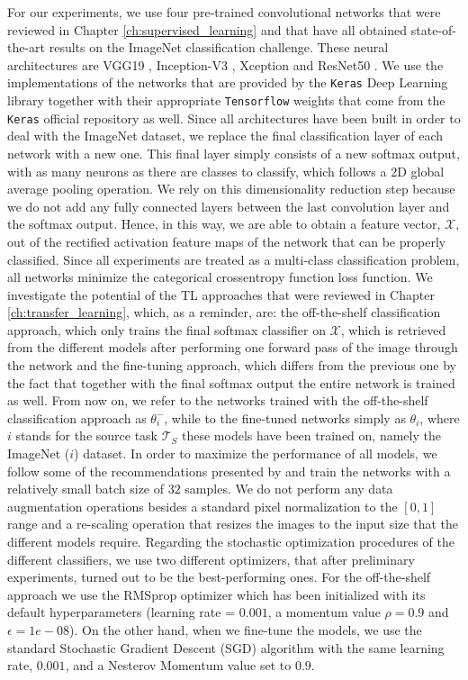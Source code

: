 For our experiments, we use four pre-trained convolutional networks that were reviewed in Chapter \ref{ch:supervised_learning} and that have all obtained state-of-the-art results on the ImageNet classification challenge. These neural architectures are VGG19 \cite{simonyan2014very}, Inception-V3 \cite{szegedy2016rethinking}, Xception \cite{chollet2016xception} and ResNet50 \cite{xie2017aggregated}. We use the implementations of the networks that are provided by the \texttt{Keras} Deep Learning library \cite{chollet2015keras} together with their appropriate \texttt{Tensorflow} weights \cite{abadi2016tensorflow} that come from the \texttt{Keras} official repository as well. Since all architectures have been built in order to deal with the ImageNet dataset, we replace the final classification layer of each network with a new one. This final layer simply consists of a new softmax output, with as many neurons as there are classes to classify, which follows a 2D global average pooling operation. We rely on this dimensionality reduction step because we do not add any fully connected layers between the last convolution layer and the softmax output. Hence, in this way, we are able to obtain a feature vector, $\mathscr{X}$, out of the rectified activation feature maps of the network that can be properly classified. Since all experiments are treated as a multi-class classification problem, all networks minimize the categorical crossentropy function loss function. We investigate the potential of the TL approaches that were reviewed in Chapter \ref{ch:transfer_learning}, which, as a reminder, are: the off-the-shelf classification approach, which only trains the final softmax classifier on $\mathscr{X}$, which is retrieved from the different models after performing one forward pass of the image through the network and the fine-tuning approach, which differs from the previous one by the fact that together with the final softmax output the entire network is trained as well. 
From now on, we refer to the networks trained with the off-the-shelf classification approach as $\theta^{-}_{i}$, while to the fine-tuned networks simply as $\theta_{i}$, where $i$ stands for the source task $\mathcal{T}_S$ these models have been trained on, namely the ImageNet ($i$) dataset. In order to maximize the performance of all models, we follow some of the recommendations presented by \citet{masters2018revisiting} and train the networks with a relatively small batch size of $32$ samples. We do not perform any data augmentation operations besides a standard pixel normalization to the $[0, 1]$ range and a re-scaling operation that resizes the images to the input size that the different models require. Regarding the stochastic optimization procedures of the different classifiers, we use two different optimizers, that after preliminary experiments, turned out to be the best-performing ones. For the off-the-shelf approach we use the RMSprop optimizer \cite{tieleman2012lecture} which has been initialized with its default hyperparameters (learning rate = $0.001$, a momentum value $\rho = 0.9$ and $\epsilon =1e-08$). On the other hand, when we fine-tune the models, we use the standard Stochastic Gradient Descent (SGD) algorithm with the same learning rate, $0.001$, and a Nesterov Momentum value \cite{nesterov1983method} set to $0.9$.

